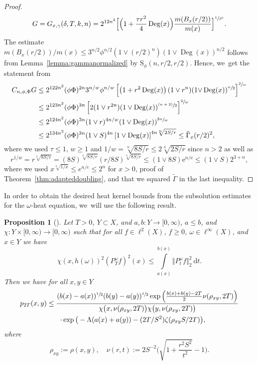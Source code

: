 \documentclass[JEP,XML,SOM,Unicode,published]{cedram}
\newcommand{\psfrac}[2]{\sfrac{(#1)}{#2}}
\newcommand{\rS}{\mathrm{S}}
\theoremstyle{plain}
\newtheorem{proposition}[theorem]{Proposition}
\theoremstyle{definition}
\newcommand{\drm}{\mathrm{d}}
\newcommand{\euler}{\mathrm{e}}
\DeclareMathOperator{\Deg}{Deg}
\let\oldint\int
\renewcommand{\int}{\oldint\limits}
\begin{document}
\begin{proof}
\[
G= {G_{x,\gamma}(\delta,T,k,n)} =2^{{12} n^2} \Bigl[\Bigl(1+\frac{\tau r^2}{4}\Deg(x)\Bigr) \frac{m(B_x(r/2))}{m(x)}\Bigr]^{\sfrac{1}{\beta^k}}.
\]
The estimate $m(B_x(r/2))/m(x)\leq {3}^{n/2}\phi^{n/2}(1\vee (r/2)^n)(1 {\vee}\Deg(x))^{n/2}$ follows from Lemma~\ref{lemma:gammanormalized} by $\rS_\phi(n,r/2,r/2)$. Hence, we~get the statement from
\begin{align*}
C_{n, \phi, \Phi}{G}
&\leq 2^{{122}n^2}(\phi\Phi)^{2n}{3}^{n/w}\phi^{n/w}
\left[
\left(1+{r^2} \Deg(x)
\right)(1\vee r^n)(1 {\vee}\Deg(x))^{\sfrac{n}{2}}
\right]
^{\sfrac{2}{w}}
\\
&\leq 2^{{123}n^2}(\phi\Phi)^{3n}
\left[2(1\vee r^{2n})
(1\vee \Deg(x))^{\psfrac{n+2}{2}}
\right]
^{\sfrac{2}{w}}
\\
&\leq 2^{{124}n^2}(\phi\Phi)^{3n}(1\vee r)^{4n/w}
(
1\vee \Deg(x)
)
^{\sfrac{2n}{w}}
\\
&\leq 2^{{134}n^2}(\phi\Phi)^{3n}
(1\vee S)^{4n}
\left[
1\vee \Deg(x)
\right]
^{{4}n\sqrt[ n]{2S/r}}
\leq {\tilde\Gamma_{x}(r{/2})^2},
\end{align*}
where we used
$ \tau \le 1 $, $w\geq 1$ {and $1/w=\sqrt[n]{8S/r} \leq 2\sqrt[n]{2S/r} $ since $n>2$ as well as}
\[
r^{1/w}=r^{\sqrt[n]{8S/r}}=(8S)^{\sqrt[n]{8S/r}}(r/8S)^{\sqrt[n]{8S/r}}\leq (1\vee 8S)\euler^{n/\euler}\leq (1\vee S) 2^{3+n},
\]
where we used $ x^{\sqrt[n]{1/x}} \le e^{n/e} \le 2^n $ for $ x>0 $, \cf proof of Theorem~\ref{thm:adapteddoubling}, and that we squared $ \tilde \Gamma $ in the last inequality.
\end{proof}

In order to obtain the desired heat kernel bounds from the subsolution estimates for the $\omega$-heat equation, we~will use the following result.

\begin{proposition}[{\cite[Th.\,5.3]{KellerRose-22a}}]\label{theorem:daviesabstractgraph}Let $T>0$,
$Y\subset X$, and
$a, b\colon Y \to [0,\infty)$, $a\leq b$, and $\chi\colon Y\times [0,\infty)\to [0,\infty)$ such that
for all $f\in \ell^2(X)$, $f\geq 0$, $\omega\in\ell^\infty(X)$, and $x\in Y$ we have
\[
\chi(x, h(\omega))^{2}(P_T^\omega f)^2(x)\leq \int_{a(x)}^{b(x)}\Vert P_t^\omega f\Vert_2^2\ \drm t.
\]
Then we have
for all $x,y\in Y$
\begin{multline*}
p_{2T}(x,y)
\leq
\frac
{
(b(x)-a(x))^{\sfrac{1}{2}}(b(y)-a(y))^{\sfrac{1}{2}}
\exp\left(\frac{b(x)+b(y)-2T}{2}\nu(\rho_{xy},2T)\right)
}
{\chi\big(x,\nu(\rho_{xy},2T)\big)\chi\big(y,\nu(\rho_{xy},2T)\big)}
\\
\quad \cdot\exp\big(-\Lambda(a(x)+a(y))-(2T/S^2)\zeta(\rho_{xy}S/2T)\big),
\end{multline*}
where
\[
\rho_{xy}:=\rho(x,y),\quad \nu(r,t):=2 S^{-2}\biggl(\sqrt{1+\frac{r^2S^2}{t^2}}-1\biggr).
\]
\end{proposition}
\end{document}
